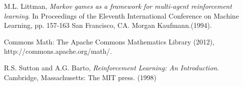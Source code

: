 \newpage
\nocite{*}


\begin{thebibliography}{9}

  M.L. Littman,
  \emph{Markov games as a framework for multi-agent reinforcement learning}. In Proceedings of the Eleventh International Conference on Machine Learning, pp. 157-163 San Francisco, CA. Morgan Kaufmann.(1994).
 
Commons Math: The Apache Commons Mathematics Library (2012),\\ http://commons.apache.org/math/. 

R.S. Sutton and A.G. Barto,
\emph{Reinforcement Learning: An Introduction}. 
Cambridge, Massachusetts: The MIT press. (1998) 
\end{thebibliography}
